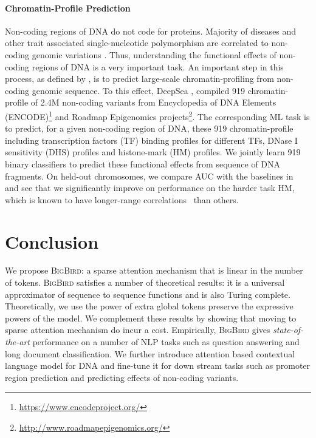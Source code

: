 \documentclass{article}
\newcommand{\bigb}{\textsc{BigBird}\xspace}
\begin{document}
\paragraph{Chromatin-Profile Prediction} Non-coding regions of DNA do not code for proteins.  
Majority of diseases and other trait associated single-nucleotide polymorphism are correlated to non-coding genomic variations \citep{zhou2015predicting, khurana2016role}.
Thus, understanding the functional effects of non-coding regions of DNA is a very important task. An important step in this process, as defined by \citet{zhou2015predicting}, is to predict large-scale chromatin-profiling from non-coding genomic sequence. 
To this effect, DeepSea \citep{zhou2015predicting}, compiled 919 chromatin-profile of 2.4M non-coding variants from Encyclopedia of DNA Elements (ENCODE)\footnote{\url{https://www.encodeproject.org/}} and Roadmap Epigenomics projects\footnote{\url{http://www.roadmapepigenomics.org/}}. 
The corresponding ML task is to predict, for a given non-coding region of DNA, these 919 chromatin-profile including  transcription factors (TF) binding profiles for  different TFs,  DNase I sensitivity (DHS) profiles and  histone-mark (HM) profiles. 
We jointly learn 919 binary classifiers to predict these functional effects from sequence of DNA fragments.
On held-out chromosomes, we compare AUC with the baselines in~ and see that we significantly improve on  performance on the harder task HM, which is known to have longer-range correlations~\citep{gates2017histone} than others. 
\section{Conclusion}
We propose \bigb: a sparse attention mechanism that is linear in the 
number of tokens. \bigb satisfies a number of theoretical results: 
 it is a universal approximator of sequence to sequence functions and is also
Turing complete.  Theoretically,  we use the power of extra global tokens
preserve the expressive powers of the model. 
We complement these results by showing that moving to sparse attention mechanism
do incur a cost. 
Empirically, \bigb  gives  \emph{state-of-the-art} performance on a number of NLP tasks such as 
question answering and long document classification. We  further introduce attention based 
contextual language model for DNA and fine-tune it for down 
stream tasks such as  promoter region prediction and predicting effects of non-coding variants. 


\end{document}
